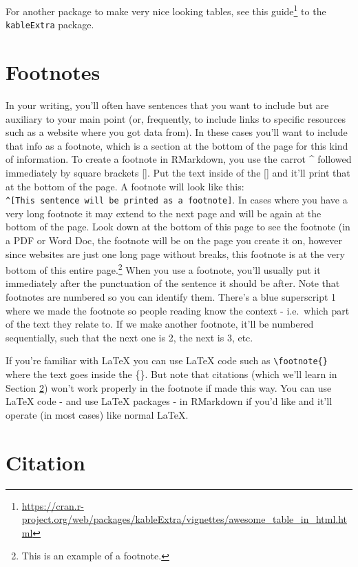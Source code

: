 \documentclass[
]{krantz}
\renewcommand{\href}[2]{#2\footnote{\url{#1}}}
\begin{document}
For another package to make very nice looking tables, see \href{https://cran.r-project.org/web/packages/kableExtra/vignettes/awesome_table_in_html.html}{this guide} to the \texttt{kableExtra} package.

\hypertarget{footnotes}{%
\section{Footnotes}\label{footnotes}}

In your writing, you'll often have sentences that you want to include but are auxiliary to your main point (or, frequently, to include links to specific resources such as a website where you got data from). In these cases you'll want to include that info as a footnote, which is a section at the bottom of the page for this kind of information. To create a footnote in RMarkdown, you use the carrot \^{} followed immediately by square brackets {[}{]}. Put the text inside of the {[}{]} and it'll print that at the bottom of the page. A footnote will look like this: \texttt{\^{}{[}This\ sentence\ will\ be\ printed\ as\ a\ footnote{]}}. In cases where you have a very long footnote it may extend to the next page and will be again at the bottom of the page. Look down at the bottom of this page to see the footnote (in a PDF or Word Doc, the footnote will be on the page you create it on, however since websites are just one long page without breaks, this footnote is at the very bottom of this entire page.\footnote{This is an example of a footnote.} When you use a footnote, you'll usually put it immediately after the punctuation of the sentence it should be after. Note that footnotes are numbered so you can identify them. There's a blue superscript 1 where we made the footnote so people reading know the context - i.e.~which part of the text they relate to. If we make another footnote, it'll be numbered sequentially, such that the next one is 2, the next is 3, etc.

If you're familiar with LaTeX you can use LaTeX code such as \texttt{\textbackslash{}footnote\{\}} where the text goes inside the \{\}. But note that citations (which we'll learn in Section \ref{citation}) won't work properly in the footnote if made this way. You can use LaTeX code - and use LaTeX packages - in RMarkdown if you'd like and it'll operate (in most cases) like normal LaTeX.

\hypertarget{citation}{%
\section{Citation}\label{citation}}
\end{document}
